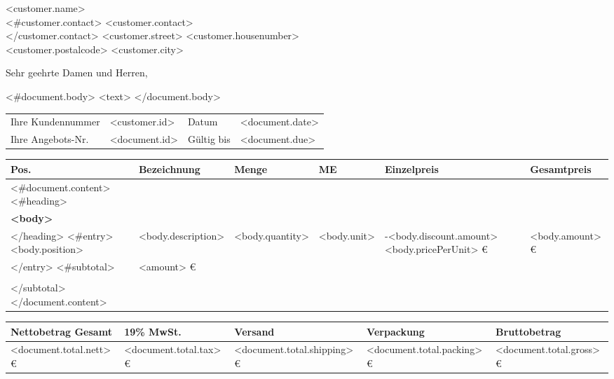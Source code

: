 \documentclass[DIN, pagenumber=footmiddle, parskip=half,
fromalign=right,  %
fromphone=true, fromfax=false,
fromrule=false]{scrlttr2}
\begin{document}
\begin{letter}{
<customer.name>\\
<#customer.contact>
<customer.contact>\\
</customer.contact>
<customer.street> <customer.housenumber>\\
<customer.postalcode> <customer.city>
}

\opening{Sehr geehrte Damen und Herren,}
<#document.body>
<text>
\newline
</document.body>

\newpage

\begin{longtable}{p{4cm}p{5.5cm}p{2cm}p{4cm}}
Ihre Kundennummer & <customer.id> & Datum & <document.date>\\
Ihre Angebots-Nr. & <document.id> & Gültig bis & <document.due>\\
\end{longtable}

\begin{longtable}{p{0.5cm}p{5.5cm}p{1cm}p{1cm}p{2.5cm}p{2.5cm}}
\hline
Pos. & Bezeichnung & Menge & ME & Einzelpreis & Gesamtpreis\\
\hline
<#document.content>
  <#heading>
    \\
    \multicolumn{6}{l}{\textbf{<body>}}\\
  </heading>
  <#entry>
    <body.position> & <body.description> & <body.quantity> & <body.unit> & -<body.discount.amount> <body.pricePerUnit> \euro{} & <body.amount> \euro{}\\
  </entry>
  <#subtotal>
    \multicolumn{5}{r}{<body>} & <amount> \euro{}\\
    \\
  </subtotal>
</document.content>
\hline
\hline 
\end{longtable}

\begin{longtable}{p{5.5cm}p{2.5cm}p{2.5cm}p{2cm}p{3cm}}
\hline Nettobetrag Gesamt & 19\% MwSt. & Versand & Verpackung & Bruttobetrag\\
\hline 
<document.total.nett> \euro{} & <document.total.tax> \euro & <document.total.shipping> \euro & <document.total.packing> \euro & <document.total.gross> \euro{}\\
\hline\hline 	
\end{longtable}

\end{letter}
\end{document}
